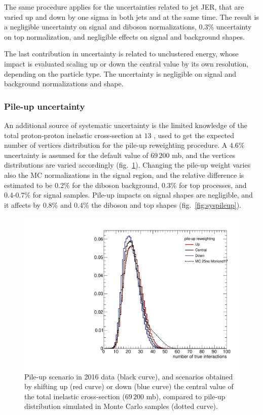 \noindent The same procedure applies for the uncertainties related to jet JER, that are varied up and down by one sigma in both jets and \met at the same time. The result is a negligible uncertainty on signal and diboson normalizations, 0.3\% uncertainty on top normalization, and negligible effects on signal and background shapes.

\noindent The last contribution in \MET uncertainty is related to unclustered energy, whose impact is evaluated scaling up or down the central value by its own resolution, depending on the particle type. The uncertainty is negligible on signal and background normalizations and shape.

\subsubsection{Pile-up uncertainty}
An additional source of systematic uncertainty is the limited knowledge of the total proton-proton inelastic cross-section at $13$ \TeV, used to get the expected number of vertices distribution for the pile-up reweighting procedure. A $4.6\%$ uncertainty is assumed for the default value of $69\,200$ mb, and the vertices distributions are varied accordingly (fig.~\ref{fig:PU_updown}). Changing the pile-up weight varies also the MC normalizations in the signal region, and the relative difference is estimated to be 0.2\% for the diboson background, 0.3\% for top processes, and 0.4-0.7\% for signal samples. Pile-up impacts on signal shapes are negligible, and it affects by 0.8\% and 0.4\% the diboson and top shapes (fig.~\ref{fig:syspileup}). %

\begin{figure}[!htb]
  \begin{center}
    \includegraphics[width=.495\textwidth]{figures/PU_Moriond17.pdf}
  \end{center}
  \caption{Pile-up scenario in 2016 data (black curve), and scenarios obtained by shifting up (red curve) or down (blue curve) the central value of the total inelastic cross-section ($69\,200$ mb), compared to pile-up distribution simulated in Monte Carlo samples (dotted curve).}
  \label{fig:PU_updown}
\end{figure}


